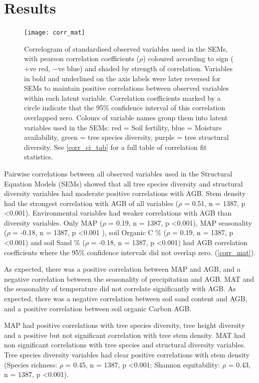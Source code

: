 \documentclass[11pt,a4paper]{article}
\begin{document}
\section{Results}

\begin{figure}[H]
\centering
	\texttt{[image: corr\_mat]}
	\caption{Correlogram of standardised observed variables used in the SEMs, with pearson correlation coefficients ($\rho$) coloured according to sign ($+$ve red, $-$ve blue) and shaded by strength of correlation. Variables in bold and underlined on the axis labels were later reversed for SEMs to maintain positive correlations between observed variables within each latent variable. Correlation coefficients marked by a circle indicate that the 95\% confidence interval of this correlation overlapped zero. Colours of variable names group them into latent variables used in the SEMs: red = Soil fertility, blue = Moisture availability, green = tree species diversity, purple = tree structural diversity. See \autoref{corr_ci_tab} for a full table of correlation fit statistics.}
	\label{corr_mat}
\end{figure}

 Pairwise correlations between all observed variables used in the Structural Equation Models (SEMs) showed that all tree species diversity and structural diversity variables had moderate positive correlations with AGB. Stem density had the strongest correlation with AGB of all variables ($\rho$ = 0.51, n = 1387, p <0.001). Environmental variables had weaker correlations with AGB than diversity variables. Only MAP ($\rho$ = 0.19, n = 1387, p <0.001), MAP seasonality ($\rho$ = -0.18, n = 1387, p <0.001 ), soil Organic C \% ($\rho$ = 0.19, n = 1387, p <0.001) and soil Sand \% ($\rho$ = -0.18, n = 1387, p <0.001) had AGB correlation coefficients where the 95\% confidence intervals did not overlap zero. (\autoref{corr_mat}). 

As expected, there was a positive correlation between MAP and AGB, and a negative correlation between the seasonality of precipitation and AGB. MAT and the seasonality of temperature did not correlate significantly with AGB. As expected, there was a negative correlation between soil sand content and AGB, and a positive correlation between soil organic Carbon AGB.

MAP had positive correlations with tree species diversity, tree height diversity and a positive but not significant correlation with tree stem density. MAT had non significant correlations with tree species and structural diversity variables. Tree species diversity variables had clear positive correlations with stem density (Species richness: $\rho$ = 0.45, n = 1387, p <0.001; Shannon equitability: $\rho$ = 0.43, n = 1387, p <0.001). 
\end{document}
